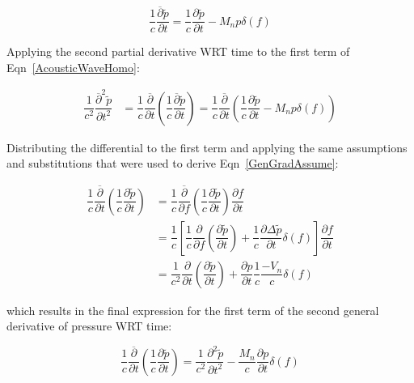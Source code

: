 \documentclass[]{aiaa-tc}%
\begin{document}
\begin{equation} \label{GenTimeP}
\dfrac{1}{c}\dfrac{\overline{\partial}\widetilde{p}}{\partial t}
= \dfrac{1}{c}\dfrac{\partial\widetilde{p}}{\partial t}
    - M_n p\delta(f)
\end{equation}

Applying the second partial derivative WRT time to the first term of Eqn~\ref{AcousticWaveHomo}:

\begin{align*}
\dfrac{1}{c^2}\dfrac{\overline{\partial}^2\widetilde{p}}{\partial t^2}
    &= \dfrac{1}{c}\dfrac{\overline{\partial}}{\partial t} \left(
    \dfrac{1}{c}\dfrac{\overline{\partial}\widetilde{p}}{\partial t} \right)
= \dfrac{1}{c}\dfrac{\overline{\partial}}{\partial t} \left(
\dfrac{1}{c}\dfrac{\partial\widetilde{p}}{\partial t}
    - M_n p\delta(f) \right)
\end{align*}

\noindent Distributing the differential to the first term and applying the same assumptions and substitutions that were used to derive Eqn~\ref{GenGradAssume}:

\begin{align*}
\dfrac{1}{c}\dfrac{\overline{\partial}}{\partial t}
    \left( \dfrac{1}{c}\dfrac{\partial\widetilde{p}}{\partial t} \right)
    &= \dfrac{1}{c}\dfrac{\overline{\partial}}{\partial f}
    \left( \dfrac{1}{c}\dfrac{\partial\widetilde{p}}{\partial t} \right)
    \dfrac{\partial f}{\partial t} \\
&= \dfrac{1}{c} \left[
    \dfrac{1}{c} \dfrac{\partial}{\partial f} \left(
    \dfrac{\partial\widetilde{p}}{\partial t} \right)
    + \dfrac{1}{c} \dfrac{\partial\Delta\widetilde{p}}{\partial t} \delta(f)
    \right] \dfrac{\partial f}{\partial t} \\
&=  \dfrac{1}{c^2} \dfrac{\partial}{\partial t} \left(
    \dfrac{\partial\widetilde{p}}{\partial t} \right)
    + \dfrac{\partial p}{\partial t} \dfrac{1}{c}\dfrac{-V_n}{c} \delta(f)
\end{align*}

\noindent which results in the final expression for the first term of the second general derivative of pressure WRT time:

\begin{equation} \label{2ndDerTerm1}
\dfrac{1}{c}\dfrac{\overline{\partial}}{\partial t}
    \left( \dfrac{1}{c}\dfrac{\partial\widetilde{p}}{\partial t} \right)
=  \dfrac{1}{c^2} \dfrac{\partial^2\widetilde{p}}{\partial t^2}
    - \dfrac{M_n}{c} \dfrac{\partial p}{\partial t}  \delta(f)
\end{equation}
\end{document}
